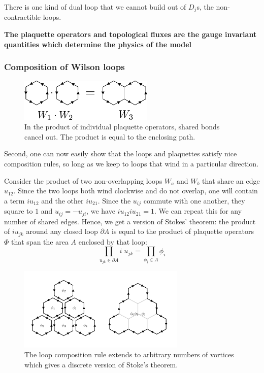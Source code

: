 There is one kind of dual loop that we cannot build out of \(D_j\)s, the non-contractible loops.

\textbf{The plaquette operators and topological fluxes are the gauge invariant quantities which determine the physics of the model}

\hypertarget{composition-of-wilson-loops}{%
\subsubsection{Composition of Wilson loops}\label{composition-of-wilson-loops}}

\begin{figure}
\hypertarget{fig:plaquette_addition_by_hand}{%
\centering
\includegraphics[width=0.57\textwidth,height=\textheight]{figure_code/amk_chapter/plaquette_addition/plaquette_addition_by_hand.pdf}
\caption{In the product of individual plaquette operators, shared bonds cancel out. The product is equal to the enclosing path.}\label{fig:plaquette_addition_by_hand}
}
\end{figure}

Second, one can now easily show that the loops and plaquettes satisfy nice composition rules, so long as we keep to loops that wind in a particular direction.

Consider the product of two non-overlapping loops \(W_a\) and \(W_b\) that share an edge \(u_{12}\). Since the two loops both wind clockwise and do not overlap, one will contain a term \(i u_{12}\) and the other \(i u_{21}\). Since the \(u_{ij}\) commute with one another, they square to \(1\) and \(u_{ij} = -u_{ji}\), we have \(i u_{12} i u_{21} = 1\). We can repeat this for any number of shared edges. Hence, we get a version of Stokes' theorem: the product of \(i u_{jk}\) around any closed loop \(\partial A\) is equal to the product of plaquette operators \(\Phi\) that span the area \(A\) enclosed by that loop: \[\prod_{u_{jk} \in \partial A} i \; u_{jk} = \prod_{\phi_i \in A} \phi_i\]

\begin{figure}
\hypertarget{fig:stokes_theorem}{%
\centering
\includegraphics[width=0.71\textwidth,height=\textheight]{figure_code/amk_chapter/stokes_theorem/stokes_theorem.pdf}
\caption{The loop composition rule extends to arbitrary numbers of vortices which gives a discrete version of Stoke's theorem.}\label{fig:stokes_theorem}
}
\end{figure}

